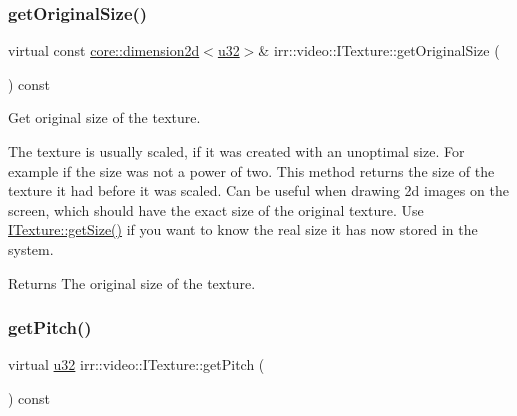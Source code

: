 \subsubsection{\texorpdfstring{get\+Original\+Size()}{getOriginalSize()}\hspace{0.1cm}{\footnotesize\ttfamily [2/2]}}
{\footnotesize\ttfamily virtual const \hyperlink{classirr_1_1core_1_1dimension2d}{core\+::dimension2d}$<$\hyperlink{namespaceirr_a0416a53257075833e7002efd0a18e804}{u32}$>$\& irr\+::video\+::\+I\+Texture\+::get\+Original\+Size (\begin{DoxyParamCaption}{ }\end{DoxyParamCaption}) const\hspace{0.3cm}{\ttfamily [pure virtual]}}



Get original size of the texture. 

The texture is usually scaled, if it was created with an unoptimal size. For example if the size was not a power of two. This method returns the size of the texture it had before it was scaled. Can be useful when drawing 2d images on the screen, which should have the exact size of the original texture. Use \hyperlink{classirr_1_1video_1_1ITexture_adfcf9558c0f1ae543782c03f7903c48e}{I\+Texture\+::get\+Size()} if you want to know the real size it has now stored in the system. \begin{DoxyReturn}{Returns}
The original size of the texture. 
\end{DoxyReturn}
\mbox{\label{classirr_1_1video_1_1ITexture_a14fd1eba217a0dd86b40c4d792ab14ea}} 
\subsubsection{\texorpdfstring{get\+Pitch()}{getPitch()}\hspace{0.1cm}{\footnotesize\ttfamily [1/2]}}
{\footnotesize\ttfamily virtual \hyperlink{namespaceirr_a0416a53257075833e7002efd0a18e804}{u32} irr\+::video\+::\+I\+Texture\+::get\+Pitch (\begin{DoxyParamCaption}{ }\end{DoxyParamCaption}) const\hspace{0.3cm}{\ttfamily [pure virtual]}}



